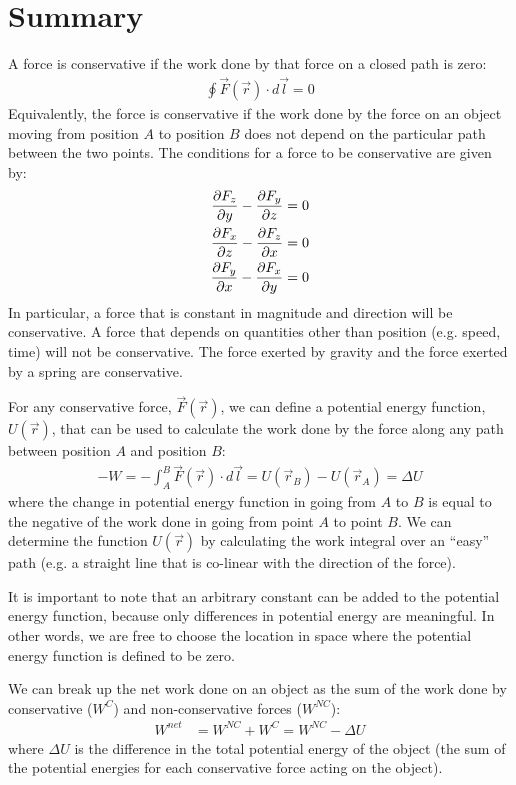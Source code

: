 \newpage
\section{Summary}
\begin{chapterSummary}
A force is conservative if the work done by that force on a closed path is zero:
\begin{align*}
\oint \vec F(\vec r) \cdot d\vec l = 0
\end{align*}
Equivalently, the force is conservative if the work done by the force on an object moving from position $A$ to position $B$ does not depend on the particular path between the two points. The conditions for a force to be conservative are given by:
\begin{align*}
\frac{\partial F_z}{\partial y}-\frac{\partial F_y}{\partial z} &= 0 \nonumber\\
\frac{\partial F_x}{\partial z}-\frac{\partial F_z}{\partial x} &= 0\nonumber\\
\frac{\partial F_y}{\partial x}-\frac{\partial F_x}{\partial y} &= 0
\end{align*}
In particular, a force that is constant in magnitude and direction will be conservative. A force that depends on quantities other than position (e.g. speed, time) will not be conservative. The force exerted by gravity and the force exerted by a spring are conservative.

For any conservative force, $\vec F(\vec r)$, we can define a potential energy function, $U(\vec r)$, that can be used to calculate the work done by the force along any path between position $A$ and position $B$:
\begin{align*}
-W = - \int_A^B \vec F(\vec r) \cdot d\vec l = U(\vec r_B) - U(\vec r_A) = \Delta U
\end{align*}
where the change in potential energy function in going from $A$ to $B$ is equal to the negative of the work done in going from point $A$ to point $B$. We can determine the function $U(\vec r)$ by calculating the work integral over an ``easy'' path (e.g. a straight line that is co-linear with the direction of the force).

It is important to note that an arbitrary constant can be added to the potential energy function, because only differences in potential energy are meaningful. In other words, we are free to choose the location in space where the potential energy function is defined to be zero.

We can break up the net work done on an object as the sum of the work done by conservative ($W^C$) and non-conservative forces ($W^{NC}$):
\begin{align*}
W^{net}&=W^{NC}+W^{C}=W^{NC}-\Delta U
\end{align*}
where $\Delta U$ is the difference in the total potential energy of the object (the sum of the potential energies for each conservative force acting on the object).


\end{chapterSummary}
